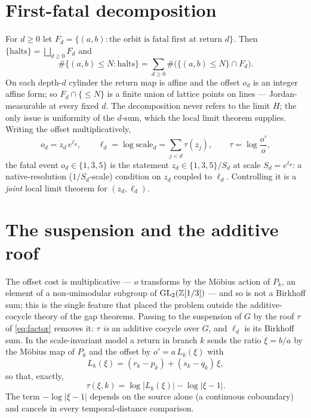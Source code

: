 \documentclass[11pt]{article}
\theoremstyle{definition}\newtheorem{definition}{Definition}
\theoremstyle{remark}\newtheorem{remark}{Remark}
\begin{document}
\section{First-fatal decomposition}\label{sec:decomp}
For $d\ge0$ let $F_d=\{(a,b):\text{the orbit is fatal first at return }d\}$.
Then $\{\text{halts}\}=\bigsqcup_{d\ge0}F_d$ and
\begin{equation}\label{eq:decomp}
\#\{(a,b)\le N:\text{halts}\}=\sum_{d\ge0}\#\bigl(\{(a,b)\le N\}\cap F_d\bigr).
\end{equation}
On each depth-$d$ cylinder the return map is affine and the offset $o_d$ is an
integer affine form; so $F_d\cap\{\le N\}$ is a finite union of lattice points
on lines --- Jordan-measurable at every fixed $d$. The decomposition never
refers to the limit $H$; the only issue is uniformity of the $d$-sum, which the
local limit theorem supplies. Writing the offset multiplicatively,
\begin{equation}\label{eq:factor}
o_d=z_d\,e^{\ell_d},\qquad \ell_d=\log\mathrm{scale}_d=\sum_{j<d}\tau(z_j),\qquad
\tau=\log\frac{o'}{o},
\end{equation}
the fatal event $o_d\in\{1,3,5\}$ is the statement $z_d\in\{1,3,5\}/S_d$ at
scale $S_d=e^{\ell_d}$: a native-resolution ($1/S_d$-scale) condition on $z_d$
coupled to $\ell_d$. Controlling it is a \emph{joint} local limit theorem for
$(z_d,\ell_d)$.

\section{The suspension and the additive roof}\label{sec:suspension}
The offset cost is multiplicative --- $o$ transforms by the M\"obius action of
$P_k$, an element of a non-unimodular subgroup of $\mathrm{GL}_2(\mathbb{Z}[1/3])$ ---
and so is not a Birkhoff sum; this is the single feature that placed the problem
outside the additive-cocycle theory of the gap theorems. Passing to the
suspension of $G$ by the roof $\tau$ of \eqref{eq:factor} removes it: $\tau$
\emph{is} an additive cocycle over $G$, and $\ell_d$ is its Birkhoff sum. In the
scale-invariant model a return in branch $k$ sends the ratio $\xi=b/a$ by the
M\"obius map of $P_k$ and the offset by $o'=a\,L_k(\xi)$ with
\begin{equation}\label{eq:Lk}
L_k(\xi)=(r_k-p_k)+(s_k-q_k)\,\xi,
\end{equation}
so that, exactly,
\begin{equation}\label{eq:tau}
\tau(\xi,k)=\log|L_k(\xi)|-\log|\xi-1|.
\end{equation}
The term $-\log|\xi-1|$ depends on the source alone (a continuous coboundary)
and cancels in every temporal-distance comparison.
\end{document}
